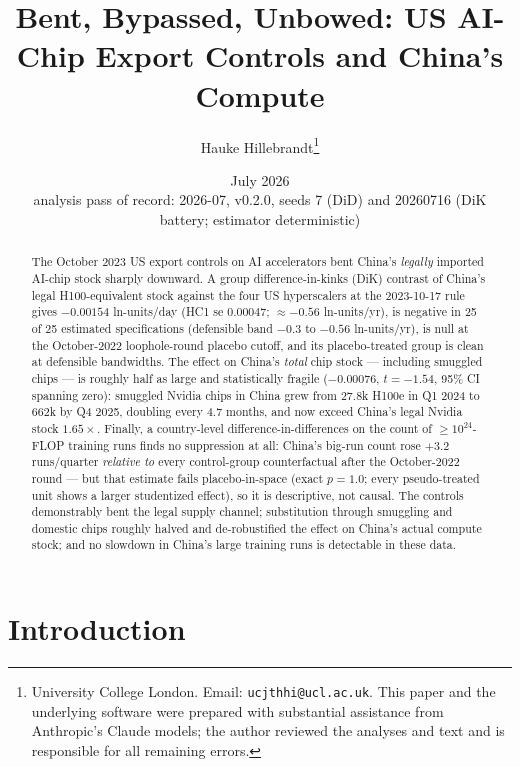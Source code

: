 \documentclass[11pt]{article}
\title{Bent, Bypassed, Unbowed: US AI-Chip Export Controls and China's Compute}
\author{Hauke Hillebrandt\thanks{University College London. Email:
\texttt{ucjthhi@ucl.ac.uk}. This paper and the underlying \natex{} software were
prepared with substantial assistance from Anthropic's Claude models; the author
reviewed the analyses and text and is responsible for all remaining errors.}}
\date{July 2026 \\ \small analysis pass of record: 2026-07, \natex{} v0.2.0,
seeds 7 (DiD) and 20260716 (DiK battery; estimator deterministic)}
\begin{document}
\maketitle

\begin{abstract}
\noindent The October 2023 US export controls on AI accelerators bent China's
\emph{legally} imported AI-chip stock sharply downward. A group
difference-in-kinks (DiK) contrast of China's legal H100-equivalent stock
against the four US hyperscalers at the 2023-10-17 rule gives $-0.00154$
ln-units/day (HC1 se $0.00047$; $\approx -0.56$ ln-units/yr), is negative in
25 of 25 estimated specifications (defensible band $-0.3$ to $-0.56$
ln-units/yr), is null at the October-2022 loophole-round placebo cutoff, and
its placebo-treated group is clean at defensible bandwidths. The effect on
China's \emph{total} chip stock --- including smuggled chips --- is roughly
half as large and statistically fragile ($-0.00076$, $t=-1.54$, 95\% CI
spanning zero): smuggled Nvidia chips in China grew from 27.8k H100e in Q1
2024 to 662k by Q4 2025, doubling every 4.7 months, and now exceed China's
legal Nvidia stock $1.65\times$. Finally, a country-level
difference-in-differences on the count of $\geq 10^{24}$-FLOP training runs
finds no suppression at all: China's big-run count rose $+3.2$ runs/quarter
\emph{relative to} every control-group counterfactual after the October-2022
round --- but that estimate fails placebo-in-space (exact $p=1.0$; every
pseudo-treated unit shows a larger studentized effect), so it is descriptive,
not causal. The controls demonstrably bent the legal supply channel;
substitution through smuggling and domestic chips roughly halved and
de-robustified the effect on China's actual compute stock; and no slowdown in
China's large training runs is detectable in these data.
\end{abstract}

\section{Introduction}\label{sec:intro}
\end{document}
